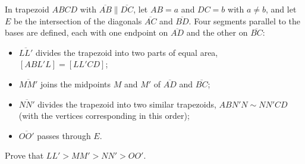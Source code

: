 In trapezoid $ABCD$ with $\overline{AB}\parallel\overline{DC}$, let $AB=a$ and $DC=b$ with $a\ne b$, and let $E$ be the intersection of the diagonals $\overline{AC}$ and $\overline{BD}$. Four segments parallel to the bases are defined, each with one endpoint on $\overline{AD}$ and the other on $\overline{BC}$:
\begin{itemize}
\item $\overline{LL'}$ divides the trapezoid into two parts of equal area, $[ABL'L]=[LL'CD]$;
\item $\overline{MM'}$ joins the midpoints $M$ and $M'$ of $\overline{AD}$ and $\overline{BC}$;
\item $\overline{NN'}$ divides the trapezoid into two similar trapezoids, $ABN'N\sim NN'CD$ (with the vertices corresponding in this order);
\item $\overline{OO'}$ passes through $E$.
\end{itemize}
Prove that $LL'>MM'>NN'>OO'$.
